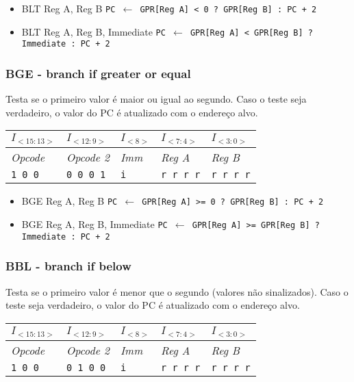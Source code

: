 \documentclass[11pt,a4paper]{report}
\begin{document}
\begin{itemize}
\item BLT Reg A, Reg B
\subitem \texttt{PC $\leftarrow$ GPR[Reg A] < 0 ? GPR[Reg B] : PC + 2}
\item BLT Reg A, Reg B, Immediate
\subitem \texttt{PC $\leftarrow$ GPR[Reg A] < GPR[Reg B] ? Immediate :  PC + 2}
\end{itemize}

\subsubsection{BGE - branch if greater or equal}
Testa se o primeiro valor é maior ou igual ao segundo. Caso o teste
seja verdadeiro, o valor do PC é atualizado com o endereço alvo.

\begin{table}[htb!]
\centering
\begin{tabular}{|p{2cm}|p{2cm}|p{2cm}|p{2cm}|p{2cm}|}
\hline
$I_{<15:13>}$ & $I_{<12:9>}$ & $I_{<8>}$ & $I_{<7:4>}$ & $I_{<3:0>}$  \\ \hline
\textit{Opcode} & \textit{Opcode 2} & \textit{Imm} & \textit{Reg A} & \textit{Reg B} \\ \hline
\texttt{1 0 0} & \texttt{0 0 0 1} & \texttt{i} & \texttt{r r r r} & \texttt{r r r r} \\ \hline
\end{tabular}
\end{table}

\begin{itemize}
\item BGE Reg A, Reg B
\subitem \texttt{PC $\leftarrow$ GPR[Reg A] >= 0 ? GPR[Reg B] : PC + 2}
\item BGE Reg A, Reg B, Immediate
\subitem \texttt{PC $\leftarrow$ GPR[Reg A] >= GPR[Reg B] ? Immediate :  PC + 2}
\end{itemize}

\subsubsection{BBL - branch if below}
Testa se o primeiro valor é menor que o segundo (valores não sinalizados).
Caso o teste seja verdadeiro, o valor do PC é atualizado com o endereço
alvo.

\begin{table}[htb!]
\centering
\begin{tabular}{|p{2cm}|p{2cm}|p{2cm}|p{2cm}|p{2cm}|}
\hline
$I_{<15:13>}$ & $I_{<12:9>}$ & $I_{<8>}$ & $I_{<7:4>}$ & $I_{<3:0>}$  \\ \hline
\textit{Opcode} & \textit{Opcode 2} & \textit{Imm} & \textit{Reg A} & \textit{Reg B} \\ \hline
\texttt{1 0 0} & \texttt{0 1 0 0} & \texttt{i} & \texttt{r r r r} & \texttt{r r r r} \\ \hline
\end{tabular}
\end{table}
\end{document}
